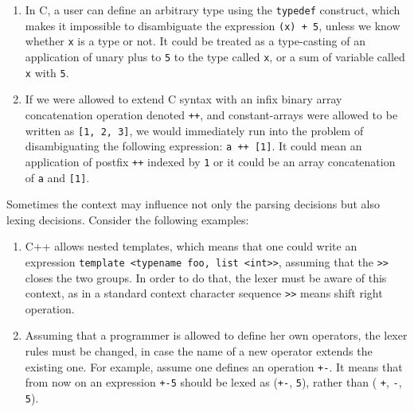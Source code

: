 \begin{enumerate}
    \item %
          In C, a user can define an arbitrary type using the
          \verb|typedef| construct, which makes it impossible 
          to disambiguate the expression \verb|(x) + 5|, unless
          we know whether \verb|x| is a type or not. It could
          be treated as a type-casting of an application of unary
          plus to \verb|5| to the type called \verb|x|,
          or a sum of variable called \verb|x| with \verb|5|.
    \item If we were allowed to extend C syntax with an infix 
          binary array concatenation operation denoted \verb|++|, and
          constant-arrays were allowed to be written as 
          \verb|[1, 2, 3]|,
          we  would immediately run into the problem of disambiguating
          the following expression: \verb|a ++ [1]|.  It could mean
          an application of postfix \verb|++| indexed by \verb|1|
          or it could be an array concatenation of \verb|a| and 
          \verb|[1]|.
\end{enumerate}

\noindent
Sometimes the context may influence not only the parsing decisions but 
also lexing decisions.  Consider the following examples:
\begin{enumerate}
    \item C++ allows nested templates, which means that one could
          write an expression \verb|template <typename foo, list <int>>|, 
          assuming that the \verb|>>| closes the two groups.  In
          order to do that, the lexer must be aware of this context,
          as in a standard context character sequence \verb|>>| means
          shift right operation.
    \item Assuming that a programmer is allowed to define her own 
          operators, the lexer rules must be changed, in case 
          the name of a new operator extends the existing one.  For
          example, assume one defines an operation \verb|+-|.
          It means that from now on an expression \verb|+-5| should
          be lexed as (\verb|+-|, \verb|5|), rather than (%
          \verb|+|, \verb|-|, \verb|5|).
\end{enumerate}

